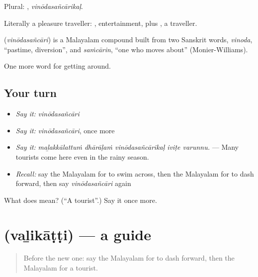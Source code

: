Plural: , \emph{vinōdasañcārikaḷ}.

Literally a pleasure traveller: , entertainment, plus , a traveller.

\begin{cousinweb}
\textbf{} (\emph{vinōdasañcāri}) is a Malayalam compound built from two Sanskrit words, \emph{vinoda}, \textquotedblleft{}pastime, diversion\textquotedblright{}, and \emph{saṁcārin}, \textquotedblleft{}one who moves about\textquotedblright{} (Monier-Williams).
\end{cousinweb}

\begin{grammarlens}[title={What you've built}]
One more word for getting around.
\end{grammarlens}

\subsection*{Your turn}
\begin{itemize}
\raggedright
  \item \emph{Say it:} \emph{vinōdasañcāri}
  \item \emph{Say it:} \emph{vinōdasañcāri}, once more
  \item \emph{Say it:} \emph{maḻakkālattuṁ dhārāḷaṁ vinōdasañcārikaḷ iviṭe varunnu.} — Many tourists come here even in the rainy season.
  \item \emph{Recall:} say the Malayalam for to swim across, then the Malayalam for to dash forward, then say \emph{vinōdasañcāri} again
\end{itemize}

\begin{tcolorbox}[breakable,colback=teal!4,colframe=teal!35!black,title={Before you move on}]
What does  mean? (\textquotedblleft{}A tourist\textquotedblright{}.) Say it once more.
\end{tcolorbox}
\section[\texorpdfstring{\ml{വഴികാട്ടി} (vaḻikāṭṭi)}{വഴികാട്ടി (vaḻikāṭṭi)}]{ (vaḻikāṭṭi) — a guide}

\label{lesson:ML-C478-valikatti}



\begin{quote}
Before the new one: say the Malayalam for to dash forward, then the Malayalam for a tourist.
\end{quote}

